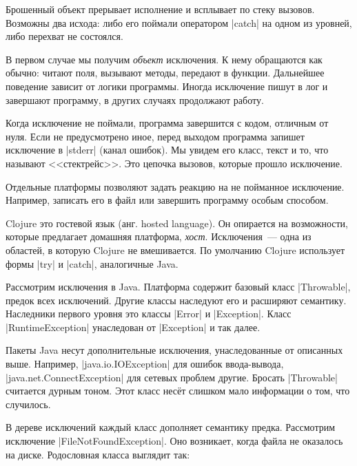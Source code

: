Брошенный объект прерывает исполнение и всплывает по стеку вызовов. Возможны два
исхода: либо его поймали оператором \spverb|catch| на одном из уровней, либо
перехват не состоялся.

В первом случае мы получим \emph{объект} исключения. К нему обращаются как
обычно: читают поля, вызывают методы, передают в функции. Дальнейшее поведение
зависит от логики программы. Иногда исключение пишут в лог и завершают
программу, в других случаях продолжают работу.

Когда исключение не поймали, программа завершится с кодом, отличным от
нуля. Если не предусмотрено иное, перед выходом программа запишет исключение в
\spverb|stderr| (канал ошибок). Мы увидем его класс, текст и то, что называют
<<стектрейс>>. Это цепочка вызовов, которые прошло исключение.


Отдельные платформы позволяют задать реакцию на не пойманное
исключение. Например, записать его в файл или завершить программу особым
способом.


Clojure это гостевой язык (анг. hosted language). Он опирается на возможности,
которые предлагает домашняя платформа, \emph{хост}. Исключения~--- одна из
областей, в которую Clojure не вмешивается. По умолчанию Clojure использует
формы \spverb|try| и \spverb|catch|, аналогичные Java.


Рассмотрим исключения в Java. Платформа содержит базовый класс
\spverb|Throwable|, предок всех исключений. Другие классы наследуют его и
расширяют семантику. Наследники первого уровня это классы \spverb|Error| и
\spverb|Exception|. Класс \spverb|RuntimeException| унаследован от
\spverb|Exception| и так далее.



Пакеты Java несут дополнительные исключения, унаследованные от описанных
выше. Например, \spverb|java.io.IOException| для ошибок ввода-вывода,
\spverb|java.net.ConnectException| для сетевых проблем другие. Бросать
\spverb|Throwable| считается дурным тоном. Этот класс нес\"{е}т слишком мало
информации о том, что случилось.

В дереве исключений каждый класс дополняет семантику предка. Рассмотрим
исключение \spverb|FileNotFoundException|. Оно возникает, когда файла не
оказалось на диске. Родословная класса выглядит так:

